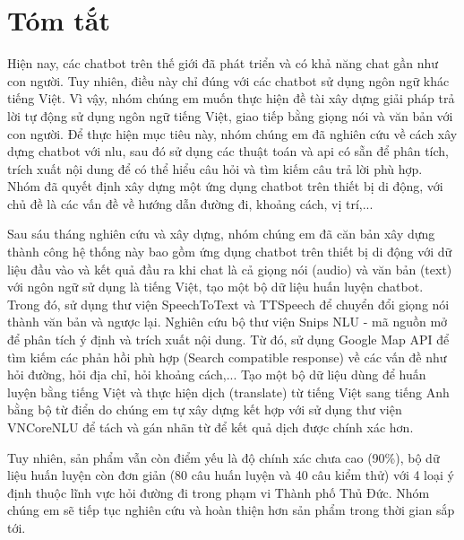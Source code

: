 \chapter*{Tóm tắt}
\label{tomtat}
Hiện nay, các chatbot trên thế giới đã phát triển và có khả năng chat gần như con người. Tuy nhiên, điều này chỉ đúng với các chatbot sử dụng ngôn ngữ khác tiếng Việt. Vì vậy, nhóm chúng em muốn thực hiện đề tài xây dựng giải pháp trả lời tự động sử dụng ngôn ngữ tiếng Việt, giao tiếp bằng giọng nói và văn bản với con người. Để thực hiện mục tiêu này, nhóm chúng em đã nghiên cứu về cách xây dựng chatbot với \ac{nlu}, sau đó sử dụng các thuật toán và \ac{api} có sẵn để phân tích, trích xuất nội dung để có thể hiểu câu hỏi và tìm kiếm câu trả lời phù hợp. Nhóm đã quyết định xây dựng một ứng dụng chatbot trên thiết bị di động, với chủ đề là các vấn đề về hướng dẫn đường đi, khoảng cách, vị trí,...

Sau sáu tháng nghiên cứu và xây dựng, nhóm chúng em đã căn bản xây dựng thành công hệ thống này bao gồm ứng dụng chatbot trên thiết bị di động với dữ liệu đầu vào và kết quả đầu ra khi chat là cả giọng nói (audio) và văn bản (text) với ngôn ngữ sử dụng là tiếng Việt, tạo một bộ dữ liệu huấn luyện chatbot. Trong đó, sử dụng thư viện SpeechToText và TTSpeech để chuyển đổi giọng nói thành văn bản và ngược lại. Nghiên cứu bộ thư viện Snips NLU - mã nguồn mở để phân tích ý định và trích xuất nội dung. Từ đó, sử dụng Google Map API để tìm kiếm các phản hồi phù hợp (Search compatible response) về các vấn đề như hỏi đường, hỏi địa chỉ, hỏi khoảng cách,... Tạo một bộ dữ liệu dùng để huấn luyện bằng tiếng Việt và thực hiện dịch (translate) từ tiếng Việt sang tiếng Anh bằng bộ từ điển do chúng em tự xây dựng kết hợp với sử dụng thư viện VNCoreNLU để tách và gán nhãn từ để kết quả dịch được chính xác hơn.

Tuy nhiên, sản phẩm vẫn còn điểm yếu là độ chính xác chưa cao (90\%), bộ dữ liệu huấn luyện còn đơn giản (80 câu huấn luyện và 40 câu kiểm thử) với 4 loại ý định thuộc lĩnh vực hỏi đường đi trong phạm vi Thành phố Thủ Đức. Nhóm chúng em sẽ tiếp tục nghiên cứu và hoàn thiện hơn sản phẩm trong thời gian sắp tới. 
